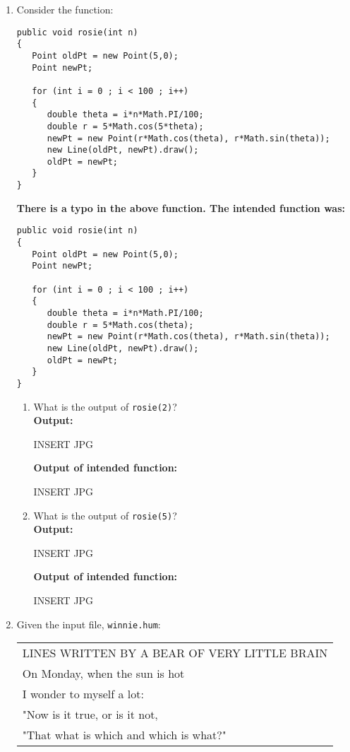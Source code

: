 \begin{enumerate}
        \item Consider the function:
\begin{verbatim}
public void rosie(int n)
{
   Point oldPt = new Point(5,0);
   Point newPt;

   for (int i = 0 ; i < 100 ; i++)
   {
      double theta = i*n*Math.PI/100;
      double r = 5*Math.cos(5*theta);
      newPt = new Point(r*Math.cos(theta), r*Math.sin(theta));
      new Line(oldPt, newPt).draw();
      oldPt = newPt; 
   }
}
\end{verbatim}

{\bf There is a typo in the above function.  The intended function
was:
\begin{verbatim}
public void rosie(int n)
{
   Point oldPt = new Point(5,0);
   Point newPt;

   for (int i = 0 ; i < 100 ; i++)
   {
      double theta = i*n*Math.PI/100;
      double r = 5*Math.cos(theta);
      newPt = new Point(r*Math.cos(theta), r*Math.sin(theta));
      new Line(oldPt, newPt).draw();
      oldPt = newPt; 
   }
}
\end{verbatim}
}

         \begin{enumerate}
             \item What is the output of {\tt rosie(2)}?\\	       	
        	{\bf Output:}
        	
INSERT JPG

        	{\bf Output of intended function:}
        	
INSERT JPG
        	
            \item What is the output of {\tt rosie(5)}?\\
        	{\bf Output:}
        	
INSERT JPG

        	{\bf Output of intended function:}
        	
INSERT JPG
        	
        	        	
                \end{enumerate}


        \item Given the input file, {\tt winnie.hum}:


        	\begin{tabular}{|l|}
            	\hline
LINES WRITTEN BY A BEAR OF VERY LITTLE BRAIN \\
On Monday, when the sun is hot \\
I wonder to myself a lot: \\
"Now is it true, or is it not, \\
"That what is which and which is what?" \\
            	\hline
        	\end{tabular}


\end{enumerate}
